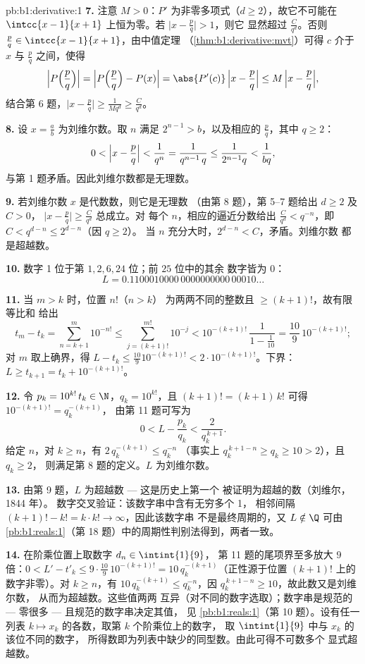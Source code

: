 \begin{solution}{pb:b1:derivative:1}
\textbf{7.} 注意 $M > 0$：$P'$ 为非零多项式（$d \geq
2$），故它不可能在
$\intcc{x-1}{x+1}$ 上恒为零。若 $\bigl|x - \frac pq\bigr| > 1$，则它
显然超过 $\frac{C}{q^d}$。否则 $\frac pq \in
\intcc{x-1}{x+1}$，由中值定理
（\cref{thm:b1:derivative:mvt}）可得 $c$ 介于 $x$ 与
$\frac pq$ 之间，使得
\[
\Bigl|P\Bigl(\frac pq\Bigr)\Bigr|
= \Bigl|P\Bigl(\frac pq\Bigr) - P(x)\Bigr|
= \abs{P'(c)}\,\Bigl|x - \frac pq\Bigr|
\leq M\,\Bigl|x - \frac pq\Bigr| ,
\]
结合第 6 题，$\bigl|x - \frac pq\bigr| \geq
\frac{1}{Mq^d} \geq \frac{C}{q^d}$。

\textbf{8.} 设 $x = \frac ab$ 为刘维尔数。取 $n$ 满足
$2^{n-1} > b$，以及相应的 $\frac pq$，其中 $q \geq 2$：
\[
0 < \Bigl|x - \frac pq\Bigr| < \frac{1}{q^n}
= \frac{1}{q^{n-1}\,q} \leq \frac{1}{2^{n-1} q} <
\frac{1}{bq} ,
\]
与第 1 题矛盾。因此刘维尔数都是无理数。

\textbf{9.} 若刘维尔数 $x$ 是代数数，则它是无理数
（由第 8 题），第 5--7 题给出 $d \geq 2$ 及 $C > 0$，
$\bigl|x - \frac pq\bigr| \geq \frac{C}{q^d}$ 总成立。对
每个 $n$，相应的逼近分数给出 $\frac{C}{q^d} <
q^{-n}$，即 $C < q^{d-n} \leq 2^{d-n}$（因 $q \geq 2$）。
当 $n$ 充分大时，$2^{d-n} < C$，矛盾。刘维尔数
都是超越数。

\textbf{10.} 数字 1 位于第 $1, 2, 6, 24$ 位；前 $25$ 位中的其余
数字皆为 0：
\[
L = 0.1100010000\,0000000000\,00010\dots
\]

\textbf{11.} 当 $m > k$ 时，位置 $n!$（$n > k$）
为两两不同的整数且 $\geq (k+1)!$，故有限等比和
给出
\[
t_m - t_k = \sum_{n=k+1}^{m} 10^{-n!}
\leq \sum_{j = (k+1)!}^{m!} 10^{-j}
< 10^{-(k+1)!}\,\frac{1}{1 - \frac1{10}}
= \frac{10}{9}\,10^{-(k+1)!} ;
\]
对 $m$ 取上确界，得 $L - t_k \leq
\frac{10}{9}10^{-(k+1)!} < 2\cdot10^{-(k+1)!}$。下界：$L
\geq t_{k+1} = t_k + 10^{-(k+1)!}$。

\textbf{12.} 令 $p_k = 10^{k!}\,t_k \in \N$，$q_k = 10^{k!}$，且
$(k+1)! = (k+1)\,k!$ 可得 $10^{-(k+1)!} = q_k^{-(k+1)}$，
由第 11 题可写为
\[
0 < L - \frac{p_k}{q_k} < \frac{2}{q_k^{\,k+1}} .
\]
给定 $n$，对 $k \geq n$，有 $2\,q_k^{-(k+1)} \leq q_k^{-n}$
（事实上 $q_k^{\,k+1-n} \geq q_k \geq 10 > 2$），且 $q_k \geq 2$，
则满足第 8 题的定义。$L$ 为刘维尔数。

\textbf{13.} 由第 9 题，$L$ 为超越数 --- 这是历史上第一个
被证明为超越的数（刘维尔，1844 年）。
数字交叉验证：该数字串中含有无穷多个 1，
相邻间隔 $(k+1)! - k! = k\cdot k! \to \infty$，因此该数字串
不是最终周期的，又 $L \notin \Q$ 可由
\cref{pb:b1:reals:1}（第 18 题）中的周期性判别法得到，两者一致。

\textbf{14.} 在阶乘位置上取数字 $d_n \in \intint{1}{9}$，
第 11 题的尾项界至多放大
$9$ 倍：$0 < L' - t'_k \leq 9\cdot\frac{10}{9}\,10^{-(k+1)!} =
10\,q_k^{-(k+1)}$（正性源于位置
$(k+1)!$ 上的数字非零）。对 $k \geq n$，有 $10\,q_k^{-(k+1)} \leq
q_k^{-n}$，因 $q_k^{\,k+1-n} \geq 10$，故此数又是刘维尔数，
从而为超越数。这些值两两
互异（对不同的数字选取）；数字串是规范的 ---
零很多 --- 且规范的数字串决定其值，
见 \cref{pb:b1:reals:1}（第 10 题）。设有任一列表 $k \mapsto
x_k$ 的各数，取第 $k$ 个阶乘位上的数字，
取 $\intint{1}{9}$ 中与 $x_k$ 的该位不同的数字，
所得数即为列表中缺少的同型数。由此可得不可数多个
显式超越数。


\end{solution}
